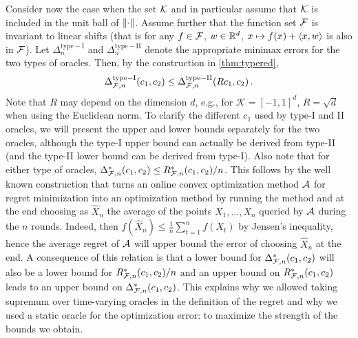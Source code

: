 Consider now the case when the set $\mathcal{K}$ and in particular assume that 
$\mathcal{K}$ is included in the unit ball of $\left\|\cdot\right\|$.
Assume further that the function set $\mathcal{F}$ is invariant to linear shifts
(that is for any $f\in \mathcal{F}$, $w\in \mathbb{R}^d$, $x\mapsto f(x) + \langle x,w \rangle$ is also in $\mathcal{F}$).
Let
 $\Delta_{n}^{\mathrm{type-I}}$ and $\Delta_{n}^{\mathrm{type-II}}$ denote  the appropriate minimax errors for the two types of oracles.
Then, by the construction in  \cref{thm:typered},
\begin{align}
\Delta_{\mathcal{F},n}^{\mathrm{type-I}}(c_1,c_2) \le \Delta_{\mathcal{F},n}^{\mathrm{type-II}}(Rc_1,c_2)\,.
\end{align}
Note that $R$ may depend on the dimension $d$, e.g., for $\mathcal{K} = \left[ -1,1 \right]^d$, $R = \sqrt{d}$ when using the Euclidean norm. To clarify the different $c_1$ used by type-I and II oracles, we will present the upper and lower bounds separately for the two oracles, although the type-I upper bound can actually be derived from type-II (and the type-II lower bound can be derived from type-I). 
Also note that for either type of oracles, $\Delta_{\mathcal{F},n}^*(c_1,c_2) \le R_{\mathcal{F},n}^*(c_1,c_2)/n$. This follows by the well known construction that turns an online convex optimization method $\mathcal{A}$ for regret minimization into an optimization method by running the method and at the end choosing as $\hat{X}_n$ the average of the points $X_1,\dots,X_n$ queried by $\mathcal{A}$ during the $n$ rounds.
Indeed, then $f(\hat{X}_n) \le \frac1n \sum_{t=1}^n f(X_t)$ by Jensen's inequality, hence the average regret of $\mathcal{A}$ will upper bound the error of choosing $\hat{X}_n$ at the end.
A consequence of this relation is that a lower bound for $\Delta_{\mathcal{F},n}^*(c_1,c_2) $ will also be a lower bound for $R^*_{\mathcal{F},n}(c_1,c_2)/n$ and an upper bound on $R^*_{\mathcal{F},n}(c_1,c_2)$ leads to an upper bound on $\Delta_{\mathcal{F},n}^*(c_1,c_2)$. This explains why we allowed taking supremum over time-varying oracles in the definition of the regret and why we used a static oracle for the optimization error: to maximize the strength of the bounds we obtain.

